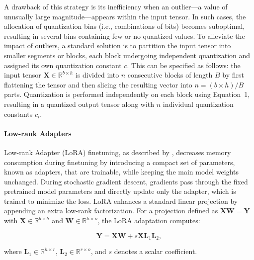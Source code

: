 A drawback of this strategy is its inefficiency when an outlier—a value of unusually large magnitude—appears within the input tensor. In such cases, the allocation of quantization bins (i.e., combinations of bits) becomes suboptimal, resulting in several bins containing few or no quantized values. To alleviate the impact of outliers, a standard solution is to partition the input tensor into smaller segments or blocks, each block undergoing independent quantization and assigned its own quantization constant $c$. This can be specified as follows: the input tensor $\mathbf{X}\in \mathbb{R}^{b\times h}$ is divided into $n$ consecutive blocks of length $B$ by first flattening the tensor and then slicing the resulting vector into ${n = ({b\times h})/{B}}$ parts. Quantization is performed independently on each block using Equation~1, resulting in a quantized output tensor along with $n$ individual quantization constants $c_i$.

\paragraph{Low-rank Adapters} Low-rank Adapter (LoRA) finetuning, as described by \citet{hu2021lora}, decreases memory consumption during finetuning by introducing a compact set of parameters, known as adapters, that are trainable, while keeping the main model weights unchanged. During stochastic gradient descent, gradients pass through the fixed pretrained model parameters and directly update only the adapter, which is trained to minimize the loss. LoRA enhances a standard linear projection by appending an extra low-rank factorization. For a projection defined as ${\mathbf{X} \mathbf{W} = \mathbf{Y}}$ with $\mathbf{X}\in  \mathbb{R}^{b\times h}$ and $\mathbf{W}\in  \mathbb{R}^{h\times o}$, the LoRA adaptation computes:

\begin{equation}
    \mathbf{Y} = \mathbf{X}\mathbf{W} + s\mathbf{X}\mathbf{L}_1\mathbf{L}_2,
\end{equation}

where $\mathbf{L}_1\in  \mathbb{R}^{h\times r}$, $\mathbf{L}_2\in  \mathbb{R}^{r\times o}$, and $s$ denotes a scalar coefficient.

